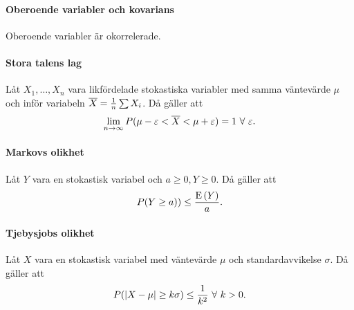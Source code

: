 \proof

\paragraph{Oberoende variabler och kovarians}
Oberoende variabler är okorrelerade.

\proof

\paragraph{Stora talens lag}
Låt $X_1, \dots, X_n$ vara likfördelade stokastiska variabler med samma väntevärde $\mu$ och inför variabeln $\overline{X} = \frac{1}{n}\sum X_i$. Då gäller att
\begin{align*}
	\lim\limits_{n\to\infty}P(\mu - \varepsilon < \overline{X} < \mu + \varepsilon) = 1\ \forall\ \varepsilon.
\end{align*}

\proof

\paragraph{Markovs olikhet}
Låt $Y$ vara en stokastisk variabel och $a\geq 0, Y\geq 0$. Då gäller att
\begin{align*}
	P(Y\geq a))\leq\frac{\text{E}\left(Y\right)}{a}.
\end{align*}

\proof

\paragraph{Tjebysjobs olikhet}
Låt $X$ vara en stokastisk variabel med väntevärde $\mu$ och standardavvikelse $\sigma$. Då gäller att
\begin{align*}
	P(\abs{X - \mu}\geq k\sigma)\leq\frac{1}{k^2}\ \forall\ k > 0.
\end{align*}